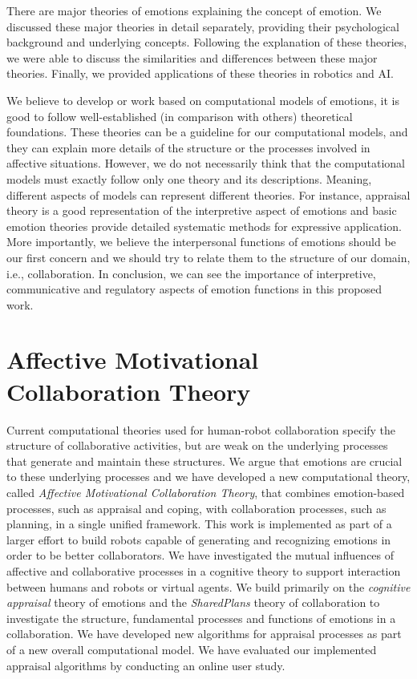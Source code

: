 \documentclass[12pt]{report}
\begin{document}
There are major theories of emotions explaining the concept of emotion. We
discussed these major theories in detail separately, providing their
psychological background and underlying concepts. Following the explanation of
these theories, we were able to discuss the similarities and differences between
these major theories. Finally, we provided applications of these theories in
robotics and AI.

We believe to develop or work based on computational models of emotions, it is
good to follow well-established (in comparison with others) theoretical
foundations. These theories can be a guideline for our computational models, and
they can explain more details of the structure or the processes involved in
affective situations. However, we do not necessarily think that the
computational models must exactly follow only one theory and its descriptions.
Meaning, different aspects of models can represent different theories. For
instance, appraisal theory is a good representation of the interpretive aspect
of emotions and basic emotion theories provide detailed systematic methods for
expressive application. More importantly, we believe the interpersonal functions
of emotions should be our first concern and we should try to relate them to the
structure of our domain, i.e., collaboration. In conclusion, we can see the
importance of interpretive, communicative and regulatory aspects of emotion
functions in this proposed work.

\chapter{Affective Motivational Collaboration Theory}
\label{ch:amct}
Current computational theories used for human-robot collaboration specify the
structure of collaborative activities, but are weak on the underlying processes
that generate and maintain these structures. We argue that emotions are crucial
to these underlying processes and we have developed a new computational theory,
called \textit{Affective Motivational Collaboration Theory}, that combines
emotion-based processes, such as appraisal and coping, with collaboration
processes, such as planning, in a single unified framework. This work is
implemented as part of a larger effort to build robots capable of generating and
recognizing emotions in order to be better collaborators. We have investigated
the mutual influences of affective and collaborative processes in a cognitive
theory to support interaction between humans and robots or virtual agents. We
build primarily on the \textit{cognitive appraisal} theory of emotions and the
\textit{SharedPlans} theory of collaboration to investigate the structure,
fundamental processes and functions of emotions in a collaboration. We have
developed new algorithms for appraisal processes as part of a new overall
computational model. We have evaluated our implemented appraisal algorithms by
conducting an online user study.
\end{document}
